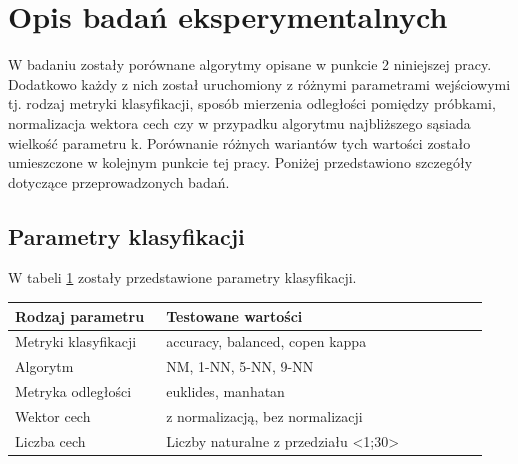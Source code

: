 \documentclass[12pt]{article}
\begin{document}
\section{Opis badań eksperymentalnych}
\indent W badaniu zostały porównane algorytmy opisane w punkcie 2 niniejszej pracy. Dodatkowo każdy z nich został uruchomiony z różnymi parametrami wejściowymi tj. rodzaj metryki klasyfikacji, sposób mierzenia odległości pomiędzy próbkami, normalizacja wektora cech czy w przypadku algorytmu najbliższego sąsiada wielkość parametru k. Porównanie różnych wariantów tych wartości zostało umieszczone w kolejnym punkcie tej pracy. Poniżej przedstawiono szczegóły dotyczące przeprowadzonych badań.\\

\subsection{Parametry klasyfikacji}
W tabeli \ref{parametry_klasyfiacji} zostały przedstawione parametry klasyfikacji.
\begin{table}[H]
\label{parametry_klasyfiacji}
	\begin{tabular}{|p{0.3\linewidth}|p{0.64\linewidth}|}%
	\hline\centering
	Rodzaj parametru 	& Testowane wartości 		\\ \hline\centering
	Metryki klasyfikacji	& accuracy, balanced, copen kappa \\ \hline\centering
	Algorytm	& NM, 1-NN, 5-NN, 9-NN \\ \hline\centering
	Metryka odległości	& euklides, manhatan \\ \hline\centering
	Wektor cech	& z normalizacją, bez normalizacji \\ \hline\centering
	Liczba cech	& Liczby naturalne z przedziału <1;30> \\ \hline
	\end{tabular}
\end{table}
\end{document}
